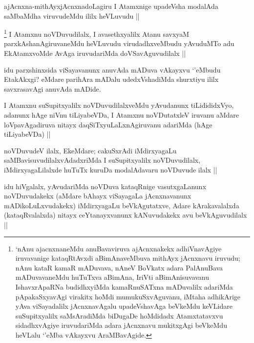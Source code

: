 
\begin{artha}
ajAcnxna-mithAyxjAcnxnadoLagiru I Atamxnige upadeVsha modalAda saMbaMdha viruvudeMdu ililx heVLuvudu ||
\end{artha}


\begin{artha}
\footnote{`nAnu ajacnxnaneMdu anuBavaviruva ajAcnxnakekx adhiVnavAgiye iruvavanige kataqRtAvxdi aBimAnaveMbuva mithAyx jAcnxnavu iruvudu; nAnu kataR kamaR mADuvava, nAneV BoVkatx adara PalAnuBava mADuvavaneMdu huTuTxva aBimAna, IriVti aBimAnisuvavanu IshavxrApaRNa budidhxyiMda kamaRnuSATxna mADuvalilx adariMda pApakaSxyavAgi virakitx hoMdi mumukuSxvAguvanu, iMtaha adhikArige yAva viSayadalilx jAcnxnavAgalu upadeVshavAga beVkeMdu keVLidare suSupitxyalilx saMsAradiMda biDugaDe hoMdidadx Atamxtatavxvu sidadhxvAgiye iruvudariMda adara jAcnxnavu mukitxgAgi beVkeMdu heVLalu `\stext'eMba vAkayxvu AraMBavAgide.}
I Atamxnu noVDuvudilalx, I avasethxyalilx Atanu savxyaM parxkAshanAgiruvaneMdu heVLuvudu virudadhxveMbudu yAvuduMTo adu EkAtamxvoMde AvAga iruvudariMda doVSavAguvudilalx ||
\end{artha}

\begin{artha}
idu parxshinxsida viSayavanunx anuvAda mADuva vAkayxvu `\stext'eMbudu EtakAkxgi? eMdare parihAra mADalu udedxVshadiMda shurxtiyu ililx savxrasavAgi anuvAda mADide.
\end{artha}


\begin{artha}
I Atamxnu suSupitxyalilx noVDuvudilalxveMdu yAvudanunx tiLidididxVyo, adanunx hAge niVnu tiLiyabeVDa, I Atamxnu noVDutatxleV iruvanu aMdare loVpavAgadiruva nitayx daqSiTxyuLaLxnAgiruvanu adariMda (hAge tiLiyabeVDa) ||
\end{artha}

 
\begin{artha}
noVDuvudeV ilalx, EkeMdare; cakuSxrAdi iMdirxyagaLu saMBavisuvudilalxvAdadxriMda I suSupitxyalilx noVDuvudilalx, iMdirxyagaLilalxde huTuTx kuruDa modalAdavaru noVDuvude ilalx ||
\end{artha}


\begin{artha}
idu hiVgalalx, yAvudariMda noVDuva kataqRnige vasutxgaLanunx noVDuvudakekx (aMdare bAhayx viSayagaLa jAcnxnavanunx mADikoLuLxvudakekx) iMdirxyagaLu beVkAgutatxve, Adare kArakavalalxda (kataqRvalalxda) nitayx ceYtanayxvanunx kANuvudakekx avu beVkAguvudilalx ||
\end{artha}


